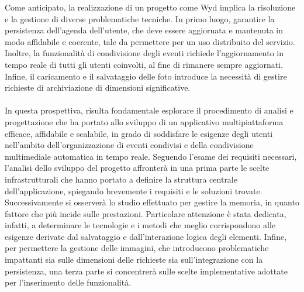 Come anticipato, la realizzazione di un progetto come Wyd implica la risoluzione e la gestione di diverse problematiche tecniche. 
In primo luogo, garantire la persistenza dell'agenda dell'utente, che deve essere aggiornata e mantenuta in modo affidabile e coerente, tale da permettere per un uso distribuito del servizio. 
Inoltre, la funzionalità di condivisione degli eventi richiede l'aggiornamento in tempo reale di tutti gli utenti coinvolti, al fine di rimanere sempre aggiornati.
Infine, il caricamento e il salvataggio delle foto introduce la necessità di gestire richieste di archiviazione di dimensioni significative.\\
\\In questa prospettiva, risulta fondamentale esplorare il procedimento di analisi e progettazione che ha portato allo sviluppo di un applicativo multipiattaforma efficace, affidabile e scalabile, in grado di soddisfare le esigenze degli utenti nell’ambito dell'organizzazione di eventi condivisi e della condivisione multimediale automatica in tempo reale.
Seguendo l’esame dei requisiti necessari, l’analisi dello sviluppo del progetto affronterà in una prima parte le scelte infrastrutturali che hanno portato a definire la struttura centrale dell’applicazione, spiegando brevemente i requisiti e le soluzioni trovate. 
Successivamente si osserverà lo studio effettuato per gestire la memoria, in quanto fattore che più incide sulle prestazioni. Particolare attenzione è stata dedicata, infatti, a determinare le tecnologie e i metodi che meglio corrispondono alle esigenze derivate dal salvataggio e dall’interazione logica degli elementi.
Infine, per permettere la gestione delle immagini, che introducono problematiche impattanti sia sulle dimensioni delle richieste sia sull'integrazione con la persistenza, una terza parte si concentrerà sulle scelte implementative adottate per l’inserimento delle funzionalità.


\clearpage
